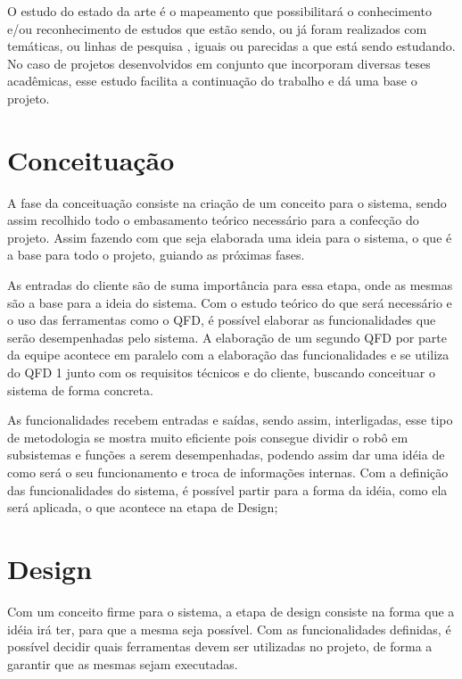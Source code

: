 O estudo do estado da arte é o mapeamento que possibilitará o conhecimento e/ou reconhecimento de estudos que estão sendo, ou já foram realizados com temáticas, ou linhas de pesquisa , iguais ou parecidas a que está sendo estudando. No caso de projetos desenvolvidos em conjunto que incorporam diversas teses acadêmicas, esse estudo facilita a continuação do trabalho e dá uma base o projeto.

\section{Conceituação}
\label{sec:conc}
A fase da conceituação consiste na criação de um conceito para o sistema, sendo assim recolhido todo o embasamento teórico necessário para a confecção do projeto. Assim fazendo com que seja elaborada uma ideia para o sistema, o que é a base para todo o projeto, guiando as próximas fases.

As entradas do cliente são de suma importância para essa etapa, onde as mesmas são a base para a ideia do sistema. Com o estudo teórico do que será necessário e o uso das ferramentas como o QFD, é possível elaborar as funcionalidades que serão desempenhadas pelo sistema. A elaboração de um segundo QFD por parte da equipe acontece em paralelo com a elaboração das funcionalidades e se utiliza do QFD 1 junto com os requisitos técnicos e do cliente, buscando conceituar o sistema de forma concreta.

As funcionalidades recebem entradas e saídas, sendo assim, interligadas, esse tipo de metodologia se mostra muito eficiente pois consegue dividir o robô em subsistemas e funções a serem desempenhadas, podendo assim dar uma idéia de como será o seu funcionamento e troca de informações internas. Com a definição das funcionalidades do sistema, é possível partir para a forma da idéia, como ela será aplicada, o que acontece na etapa de Design;  


\section{Design}
\label{sec:design}
Com um conceito firme para o sistema, a etapa de design consiste na forma que a idéia irá ter, para que a mesma seja possível. Com as funcionalidades definidas, é possível decidir quais ferramentas devem ser utilizadas no projeto, de forma a garantir que as mesmas sejam executadas. 

